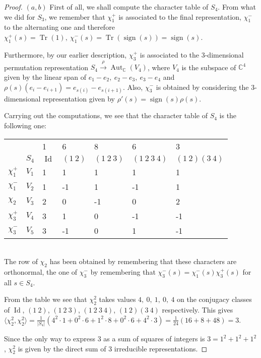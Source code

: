 \documentclass{article}
\newcommand{\numberset}{\mathbb}
\newcommand{\C}{\numberset{C}}
\DeclareMathOperator{\Id}{Id}
\DeclareMathOperator{\Aut}{Aut}
\DeclareMathOperator{\sign}{sign}
\DeclareMathOperator{\Tr}{Tr}
\begin{document}
\begin{proof}
    $(a,b)$ First of all, we shall compute the character table of $S_4$. From
    what we did for $S_3$, we remember that $\chi_1^+$ is associated to the
    final representation, $\chi_1^-$ to the alternating one and therefore
    $\chi_1^+(s)=\Tr(1),\ \chi_1^-(s)=\Tr(\sign(s))=\sign(s)$.
    
    Furthermore, by our earlier description, $\chi_3^+$ is associated
    to the 3-dimensional permutation representation
    $S_4\xrightarrow{\rho}\Aut_{\C}(V_4)$, where $V_4$ is the subspace of $\C^4$
    given by the linear span of $e_1-e_2,\ e_2-e_3,\ e_3-e_4$ and
    $\rho(s)(e_i-e_{i+1})=e_{s(i)}-e_{s(i+1)}$. Also, $\chi_3^-$ is obtained by
    considering the 3-dimensional representation given by
    $\rho'(s)=\sign(s)\rho(s)$.

    Carrying out the computations, we see that the character table of $S_4$ is
    the following one:
    
    \begin{tabular}{ll|l|l|l|l|l}
        &  &1  &6  &8  &6  &3 \\
        &$S_4$  &$\Id$  &$(1\ 2)$  &$(1\ 2\ 3)$  &$(1\ 2\ 3\ 4)$
        &$(1\ 2)(3\ 4)$ \\ \hline
        $\chi_1^+$  &$V_1$  &1  &1  &1  &1  &1 \\
        $\chi_1^-$  &$V_2$  &1  &-1  &1  &-1  &1 \\
        $\chi_2$  &$V_3$  &2  &0  &-1  &0  &2 \\
        $\chi_3^+$  &$V_4$  &3  &1  &0  &-1  &-1 \\
        $\chi_3^-$  &$V_5$  &3  &-1  &0  &1  &-1
    \end{tabular}

    ~\\
    The row of $\chi_2$ has been obtained by remembering that these characters
    are orthonormal, the one of $\chi_3^-$ by remembering that
    $\chi_3^-(s)=\chi_1^-(s)\chi_3^+(s)$ for all $s\in S_4$.

    From the table we see that $\chi_2^2$ takes values $4,\ 0,\ 1,\ 0,\ 4$ on
    the conjugacy classes of $\Id$, $(1\ 2)$, $(1\ 2\ 3)$, $(1\ 2\ 3\ 4)$, 
    $(1\ 2)(3\ 4)$ respectively. This gives
    $\langle\chi_2^2,\chi_2^2\rangle=\frac{1}{|S_4|}(4^2\cdot 1+0^2\cdot
    6+1^2\cdot 8+0^2\cdot 6+4^2\cdot 3)=\frac{1}{24}(16+8+48)=3$.

    Since the only way to express 3 as a sum of squares of integers is
    $3=1^2+1^2+1^2$, $\chi_2^2$ is given by the direct sum of 3 irreducible
   representations.


\end{proof}
\end{document}
